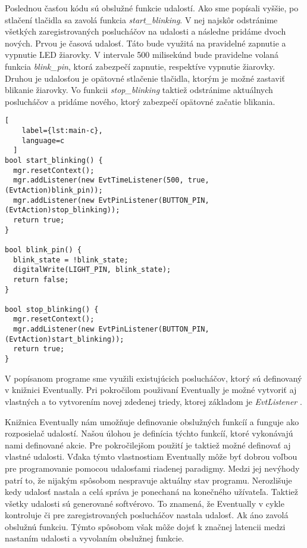 \par Poslednou časťou kódu sú obslužné funkcie udalostí. Ako sme popísali vyššie, po stlačení tlačidla sa zavolá funkcia \textit{start\_blinking}. V nej najskôr odstránime všetkých zaregistrovaných poslucháčov na udalosti a následne pridáme dvoch nových. Prvou je časová udalosť. Táto bude využitá na pravidelné zapnutie a vypnutie LED žiarovky. V intervale 500 milisekúnd bude pravidelne volaná funkcia \textit{blink\_pin}, ktorá zabezpečí zapnutie, respektíve vypnutie žiarovky. Druhou je udalosťou je opätovné stlačenie tlačidla, ktorým je možné zastaviť blikanie žiarovky. Vo funkcii \textit{stop\_blinking} taktiež odstránime aktuálnych poslucháčov a pridáme nového, ktorý zabezpečí opätovné začatie blikania. 

\begin{lstlisting}[
    label={lst:main-c},
    language=c
  ]
bool start_blinking() {
  mgr.resetContext(); 
  mgr.addListener(new EvtTimeListener(500, true, (EvtAction)blink_pin));
  mgr.addListener(new EvtPinListener(BUTTON_PIN, (EvtAction)stop_blinking));
  return true;
}

bool blink_pin() {
  blink_state = !blink_state;
  digitalWrite(LIGHT_PIN, blink_state);
  return false;
}
  
bool stop_blinking() {
  mgr.resetContext();
  mgr.addListener(new EvtPinListener(BUTTON_PIN, (EvtAction)start_blinking));
  return true;
}

\end{lstlisting}

\par V popísanom programe sme využili existujúcich poslucháčov, ktorý sú definovaný v knižnici Eventually. Pri pokročilom použivaní Eventually je možné vytvoriť aj vlastných a to vytvorením novej zdedenej triedy, ktorej základom je \textit{EvtListener} \cite{bartlettEventually2021}.

\par Knižnica Eventually nám umožňuje definovanie obslužných funkcíí a funguje ako rozposielač udalostí. Našou úlohou je definícia týchto funkcíí, ktoré vykonávajú nami definované akcie.
Pre pokročilejšom použití je taktiež možné definovať aj vlastné udalosti. Vďaka týmto 
vlastnostiam Eventually môže byť dobrou voľbou pre programovanie pomocou udalosťami riadenej 
paradigmy. Medzi jej nevýhody patrí to, že nijakým spôsobom nespravuje aktuálny stav programu. Nerozlišuje kedy udalosť nastala a celá správa je ponechaná na konečného užívateľa.
Taktiež všetky udalosti sú generované softvérovo. To znamená, že Eventually v cykle kontroluje či pre zaregistrovaných poslucháčov nastala udalosť. Ak áno zavolá obslužnú funkciu. Týmto spôsobom však môže dojsť k značnej latencii medzi nastaním udalosti a vyvolaním obslužnej funkcie.